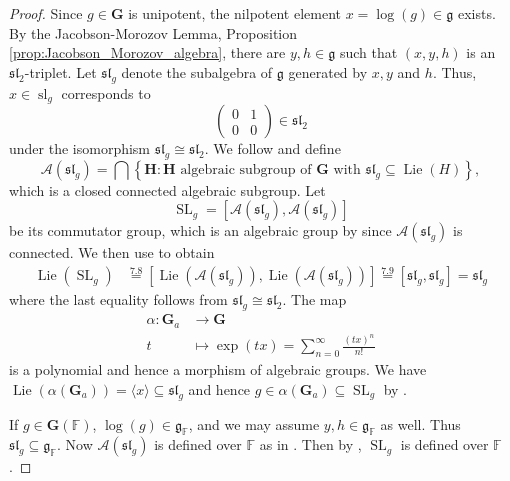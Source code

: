 \documentclass[12pt]{amsart}
\newcommand{\F}{\mathbb{F} }
\newcommand{\frakg}{\mathfrak{g}}
\newcommand{\bG}{\mathbf{G}}
\newcommand{\bH}{\mathbf{H}}
\numberwithin{equation}{section}
\theoremstyle{remark} %
\begin{document}
\begin{proof}
	Since $g \in \bG$ is unipotent, the nilpotent element $x=\log(g)\in \frakg $ exists. 
	By the Jacobson-Morozov Lemma, Proposition \ref{prop:Jacobson_Morozov_algebra}, there are $y,h \in \frakg$ such that $(x,y,h)$ is an $\mathfrak{sl}_2$-triplet. Let $\mathfrak{sl}_g$ denote the subalgebra of $\frakg$ generated by $x,y$ and $h$. Thus, $x \in \operatorname{sl}_g$ corresponds to
	$$
	\begin{pmatrix}
		0 & 1 \\ 0 & 0
	\end{pmatrix}\in \mathfrak{sl}_2
	$$
	under the isomorphism $\mathfrak{sl}_g \cong \mathfrak{sl}_2$.
	We follow \cite[7.1]{Bor} and define
	$$
	\mathcal{A}(\mathfrak{sl}_g) = \bigcap \left\{ \bH \colon \bH \text{ algebraic subgroup of $\bG$ with } \mathfrak{sl}_g \subseteq \operatorname{Lie}(H) \right\},
	$$
	which is a %
	closed connected algebraic subgroup. Let 
	$$
	\operatorname{SL}_g = [	\mathcal{A}(\mathfrak{sl}_g) , 	\mathcal{A}(\mathfrak{sl}_g) ]
	$$ 
	be its commutator group, which is an algebraic group by \cite[2.3]{Bor} since $\mathcal{A}(\mathfrak{sl}_g)$ is connected. We then use \cite{Bor} to obtain
	\begin{align*}
		\operatorname{Lie}(\operatorname{SL}_g ) &\stackrel{7.8}{=} [ \operatorname{Lie} (\mathcal{A}(\mathfrak{sl}_g)) ,\operatorname{Lie}( \mathcal{A}(\mathfrak{sl}_g) )] \stackrel{7.9}{=} [\mathfrak{sl}_g , \mathfrak{sl}_g] = \mathfrak{sl}_g
	\end{align*}
	where the last equality follows from $\mathfrak{sl}_g \cong \mathfrak{sl}_2$. The map
	\begin{align*}
		\alpha \colon \bG_a & \to \bG \\
		t & \mapsto \exp(tx) = \sum_{n= 0}^\infty \frac{(tx)^n}{n!}
	\end{align*}
	is a polynomial and hence a morphism of algebraic groups. We have $\operatorname{Lie}(\alpha(\bG_a)) = \langle x \rangle \subseteq \mathfrak{sl}_g$ and hence 
	$
	g \in \alpha(\bG_a) \subseteq \operatorname{SL}_g
	$ 
	by \cite[7.1(2)]{Bor}.
	
	If $g \in \bG(\F)$, $\log(g) \in \frakg_\F$, and we may assume $y,h \in \frakg_\F$ as well. Thus $\mathfrak{sl}_g \subseteq \frakg_\F$. Now $\mathcal{A}(\mathfrak{sl}_g)$ is defined over $\F$ as in \cite[2.1(b)]{Bor}. %
	Then by \cite[2.3]{Bor}, $\operatorname{SL}_g$ is defined over $\F$. 
\end{proof}
\end{document}
